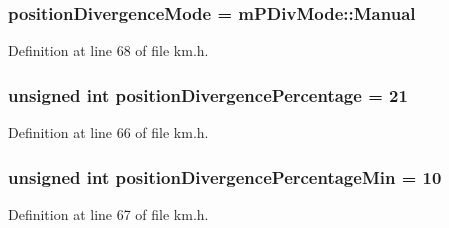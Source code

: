 \subsubsection[{\texorpdfstring{position\+Divergence\+Mode}{positionDivergenceMode}}]{ position\+Divergence\+Mode = {\bf m\+P\+Div\+Mode\+::\+Manual}}\hypertarget{struct_k_1_1m_quoting_params_a2304a83d8a52934be7c132f9fb6fd479}{}\label{struct_k_1_1m_quoting_params_a2304a83d8a52934be7c132f9fb6fd479}


Definition at line 68 of file km.\+h.

\subsubsection[{\texorpdfstring{position\+Divergence\+Percentage}{positionDivergencePercentage}}]{\setlength{\rightskip}{0pt plus 5cm}unsigned int position\+Divergence\+Percentage = 21}\hypertarget{struct_k_1_1m_quoting_params_a87100c1d4acfed663be3c8a52ac3a646}{}\label{struct_k_1_1m_quoting_params_a87100c1d4acfed663be3c8a52ac3a646}


Definition at line 66 of file km.\+h.

\subsubsection[{\texorpdfstring{position\+Divergence\+Percentage\+Min}{positionDivergencePercentageMin}}]{\setlength{\rightskip}{0pt plus 5cm}unsigned int position\+Divergence\+Percentage\+Min = 10}\hypertarget{struct_k_1_1m_quoting_params_ac6a1449dd763064f3e4f741db7826f34}{}\label{struct_k_1_1m_quoting_params_ac6a1449dd763064f3e4f741db7826f34}


Definition at line 67 of file km.\+h.

